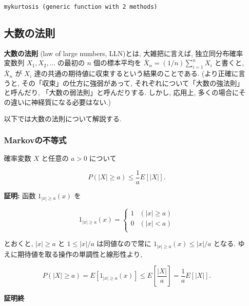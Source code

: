 \documentclass[10pt, a4paper,xelatex,ja=standard]{bxjsarticle}
\makeatletter
\newcommand{\boxspacing}{\kern\kvtcb@left@rule\kern\kvtcb@boxsep}
\newcommand{\prompt}[4]{
        \ttfamily\llap{{\color{#2}[#3]:\hspace{3pt}#4}}\vspace{-\baselineskip}
    }
\makeatother
\begin{document}
            \begin{tcolorbox}[breakable, size=fbox, boxrule=.5pt, pad at break*=1mm, opacityfill=0]
\prompt{Out}{outcolor}{3}{\boxspacing}
\begin{Verbatim}[commandchars=\\\{\}]
mykurtosis (generic function with 2 methods)
\end{Verbatim}
\end{tcolorbox}
        
    \hypertarget{ux5927ux6570ux306eux6cd5ux5247}{%
\subsection{大数の法則}\label{ux5927ux6570ux306eux6cd5ux5247}}

\textbf{大数の法則} (law of large numbers, LLN)とは, 大雑把に言えば,
独立同分布確率変数列 \(X_1,X_2,\ldots\) の最初の \(n\) 個の標本平均を
\(\bar{X}_n = (1/n)\sum_{i=1}^n X_i\) と書くと, \(\bar{X}_n\) が \(X_i\)
達の共通の期待値に収束するという結果のことである. (より正確に言うと,
その「収束」の仕方に強弱があって,
それぞれについて「大数の強法則」と呼んだり,
「大数の弱法則」と呼んだりする. しかし, 応用上,
多くの場合にその違いに神経質になる必要はない.)

以下では大数の法則について解説する.

    \hypertarget{markovux306eux4e0dux7b49ux5f0f}{%
\subsubsection{Markovの不等式}\label{markovux306eux4e0dux7b49ux5f0f}}

確率変数 \(X\) と任意の \(a>0\) について

\[
P(|X|\ge a) \le \frac{1}{a}E[|X|].
\]

\textbf{証明:} 函数 \(1_{|x|\ge a}(x)\) を

\[
1_{|x|\ge a}(x) = \begin{cases}
1 & (|x|\ge a) \\
0 & (|x| <  a) \\
\end{cases}
\]

とおくと, \(|x|\ge a\) と \(1\le |x|/a\) は同値なので常に
\(1_{|x|\ge a}(x) \le |x|/a\) となる.
ゆえに期待値を取る操作の単調性と線形性より,

\[
P(|X|\ge a) = E[1_{|x|\ge a}(x)] \le E\left[\frac{|X|}{a}\right] = \frac{1}{a}E[|X|].
\]

\textbf{証明終}
\end{document}
